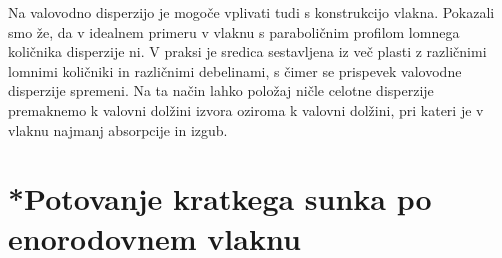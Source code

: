 \begin{remark}
Na valovodno disperzijo je mogoče vplivati tudi s konstrukcijo vlakna. Pokazali smo že, da
v idealnem primeru v vlaknu s paraboličnim profilom lomnega količnika disperzije ni. 
V praksi je sredica sestavljena iz več plasti z različnimi lomnimi količniki in različnimi
debelinami, s čimer se prispevek valovodne disperzije spremeni. Na ta način lahko 
položaj ničle celotne disperzije premaknemo k valovni dolžini izvora oziroma k 
valovni dolžini, pri kateri je v vlaknu najmanj absorpcije in izgub.
\end{remark}

\section{*Potovanje kratkega sunka po enorodovnem vlaknu}
\label{chap:sunvl}
